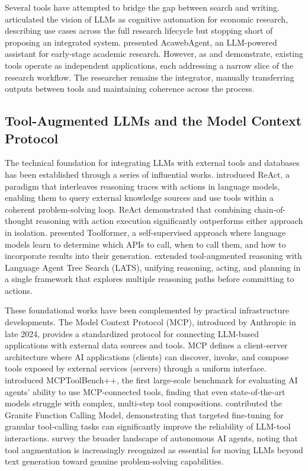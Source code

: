 \documentclass{article}
\begin{document}
Several tools have attempted to bridge the gap between search and writing. \citet{korinek2023language} articulated the vision of LLMs as cognitive automation for economic research, describing use cases across the full research lifecycle but stopping short of proposing an integrated system. \citet{yang2024acawebagent} presented AcawebAgent, an LLM-powered assistant for early-stage academic research. However, as \citet{preisler2024correctness} and \citet{hayn2024quality} demonstrate, existing tools operate as independent applications, each addressing a narrow slice of the research workflow. The researcher remains the integrator, manually transferring outputs between tools and maintaining coherence across the process.

\subsection{Tool-Augmented LLMs and the Model Context Protocol}

The technical foundation for integrating LLMs with external tools and databases has been established through a series of influential works. \citet{yao2022react} introduced ReAct, a paradigm that interleaves reasoning traces with actions in language models, enabling them to query external knowledge sources and use tools within a coherent problem-solving loop. ReAct demonstrated that combining chain-of-thought reasoning with action execution significantly outperforms either approach in isolation. \citet{schick2023toolformer} presented Toolformer, a self-supervised approach where language models learn to determine which APIs to call, when to call them, and how to incorporate results into their generation. \citet{zhou2023lats} extended tool-augmented reasoning with Language Agent Tree Search (LATS), unifying reasoning, acting, and planning in a single framework that explores multiple reasoning paths before committing to actions.

These foundational works have been complemented by practical infrastructure developments. The Model Context Protocol (MCP), introduced by Anthropic in late 2024, provides a standardized protocol for connecting LLM-based applications with external data sources and tools. MCP defines a client-server architecture where AI applications (clients) can discover, invoke, and compose tools exposed by external services (servers) through a uniform interface. \citet{fan2025mcptoolbench} introduced MCPToolBench++, the first large-scale benchmark for evaluating AI agents' ability to use MCP-connected tools, finding that even state-of-the-art models struggle with complex, multi-step tool compositions. \citet{abdelaziz2024granite} contributed the Granite Function Calling Model, demonstrating that targeted fine-tuning for granular tool-calling tasks can significantly improve the reliability of LLM-tool interactions. \citet{ferrag2025llm_agents} survey the broader landscape of autonomous AI agents, noting that tool augmentation is increasingly recognized as essential for moving LLMs beyond text generation toward genuine problem-solving capabilities.
\end{document}

